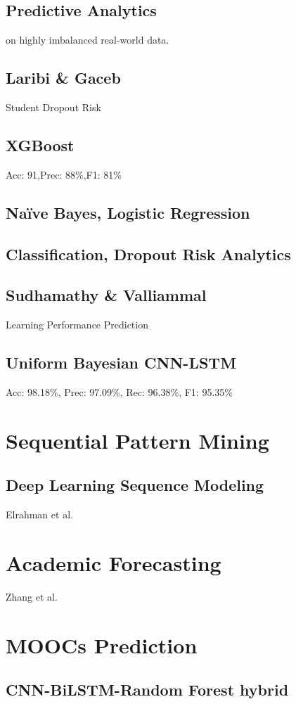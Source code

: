 \documentclass[twocolumn]{svjour3}
\begin{document}
\subsection{Predictive Analytics}
on highly imbalanced real-world data.
\subsection{Laribi \& Gaceb \cite{12}}
Student Dropout Risk
\subsection{XGBoost}
Acc: 91,Prec: 88\%,F1: 81\%
\subsection{Naïve Bayes, Logistic Regression}
\subsection{Classification, Dropout Risk Analytics}
\subsection{Sudhamathy \& Valliammal \cite{13}}
Learning Performance Prediction
\subsection{Uniform Bayesian CNN-LSTM}
Acc: 98.18\%, Prec: 97.09\%, Rec: 96.38\%, F1: 95.35\%

\section{Sequential Pattern Mining}
\subsection{Deep Learning Sequence Modeling}
Elrahman et al. \cite{14}
\section{Academic Forecasting}
Zhang et al. \cite{15}
\section{MOOCs Prediction}
\subsection{CNN-BiLSTM-Random Forest hybrid}
\end{document}
